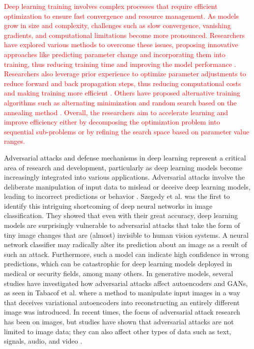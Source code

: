 \documentclass[preprint,12pt]{elsarticle}
\begin{document}
\textcolor{red}{Deep learning training involves complex processes that require efficient optimization to ensure fast convergence and resource management. As models grow in size and complexity, challenges such as slow convergence, vanishing gradients, and computational limitations become more pronounced. Researchers have explored various methods to overcome these issues, proposing innovative approaches like predicting parameter change and incorporating them into training, thus reducing training time and improving the model performance \citep{ying_enhancing_2024}. Researchers also leverage prior experience to optimize parameter adjustments to reduce forward and back propagation steps, thus reducing computational costs and making training more efficient \citep{wang_optimizing_2024}. Others have proposed alternative training algorithms such as alternating minimization \citep{yan_triple-inertial_2025} and random search based on the annealing method \citep{krasnoproshin_random_2024}. Overall, the researchers aim to accelerate learning and improve efficiency either by decomposing the optimization problem into sequential sub-problems or by refining the search space based on parameter value ranges.}

Adversarial attacks and defense mechanisms in deep learning represent a critical area of research and development, particularly as deep learning models become increasingly integrated into various applications. Adversarial attacks involve the deliberate manipulation of input data to mislead or deceive deep learning models, leading to incorrect predictions or behavior \citep{adversarial2018}. Szegedy et al. \citep{szegedy2013intriguing} was the first to identify this intriguing shortcoming of deep neural networks in image classification. They showed that even with their great accuracy, deep learning models are surprisingly vulnerable to adversarial attacks that take the form of tiny image changes that are (almost) invisible to human vision systems. A neural network classifier may radically alter its prediction about an image as a result of such an attack. Furthermore, such a model can indicate high confidence in wrong predictions, which can be catastrophic for deep learning models deployed in medical or security fields, among many others. In generative models, several studies have investigated how adversarial attacks affect autoencoders and GANs, as seen in Tabacof et al. \citep{tabacof2016adversarial} where a method to manipulate input images in a way that deceives variational autoencoders into reconstructing an entirely different image was introduced. In recent times, the focus of adversarial attack research has been on images, but studies have shown that adversarial attacks are not limited to image data; they can also affect other types of data such as text, signals, audio, and video \citep{zhang2020adversarial, jiang2019black, esmaeilpour2019robust}.
\end{document}
